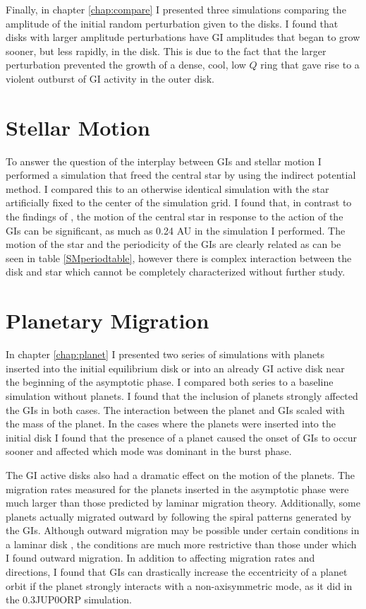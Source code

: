 Finally, in chapter \ref{chap:compare} I presented three simulations comparing the amplitude of the initial random perturbation given to the disks. I found that disks with larger amplitude perturbations have GI amplitudes that began to grow sooner, but less rapidly, in the disk. This is due to the fact that the larger perturbation prevented the growth of a dense, cool, low $Q$ ring that gave rise to a violent outburst of GI activity in the outer disk.

\section{Stellar Motion}

To answer the question of the interplay between GIs and stellar motion I performed a simulation that freed the central star by using the indirect potential method. I compared this to an otherwise identical simulation with the star artificially fixed to the center of the simulation grid. I found that, in contrast to the findings of \citet{rice2003a}, the motion of the central star in response to the action of the GIs can be significant, as much as 0.24 AU in the simulation I performed. The motion of the star and the periodicity of the GIs are clearly related as can be seen in table \ref{SMperiodtable}, however there is complex interaction between the disk and star which cannot be completely characterized without further study. 

\section{Planetary Migration}

In chapter \ref{chap:planet} I presented two series of simulations with planets inserted into the initial equilibrium disk or into an already GI active disk near the beginning of the asymptotic phase. I compared both series to a baseline simulation without planets. I found that the inclusion of planets strongly affected the GIs in both cases. The interaction between the planet and GIs scaled with the mass of the planet. In the cases where the planets were inserted into the initial disk I found that the presence of a planet caused the onset of GIs to occur sooner and affected which mode was dominant in the burst phase. 

The GI active disks also had a dramatic effect on the motion of the planets. The migration rates measured for the planets inserted in the asymptotic phase were much larger than those predicted by laminar migration theory. Additionally, some planets actually migrated outward by following the spiral patterns generated by the GIs. Although outward migration may be possible under certain conditions in a laminar disk \citep{paardekooper2010}, the conditions are much more restrictive than those under which I found outward migration. In addition to affecting migration rates and directions, I found that GIs can drastically increase the eccentricity of a planet orbit if the planet strongly interacts with a non-axisymmetric mode, as it did in the 0.3JUP0ORP simulation.

